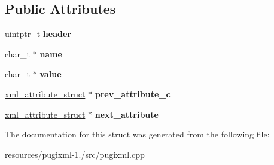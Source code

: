 \subsection*{Public Attributes}
\begin{DoxyCompactItemize}
\item 
\hypertarget{structpugi_1_1xml__attribute__struct_a0dca6ca6c129bbf87a7ebaf87f3e12de}{uintptr\+\_\+t {\bfseries header}}\label{structpugi_1_1xml__attribute__struct_a0dca6ca6c129bbf87a7ebaf87f3e12de}

\item 
\hypertarget{structpugi_1_1xml__attribute__struct_aa886c4aae23a132e1704717721ee2c19}{char\+\_\+t $\ast$ {\bfseries name}}\label{structpugi_1_1xml__attribute__struct_aa886c4aae23a132e1704717721ee2c19}

\item 
\hypertarget{structpugi_1_1xml__attribute__struct_ae652627d56cb9dcc0afdd1fbf6570364}{char\+\_\+t $\ast$ {\bfseries value}}\label{structpugi_1_1xml__attribute__struct_ae652627d56cb9dcc0afdd1fbf6570364}

\item 
\hypertarget{structpugi_1_1xml__attribute__struct_a0e3a022235b316e4cfc1034ceb7d7862}{\hyperlink{structpugi_1_1xml__attribute__struct}{xml\+\_\+attribute\+\_\+struct} $\ast$ {\bfseries prev\+\_\+attribute\+\_\+c}}\label{structpugi_1_1xml__attribute__struct_a0e3a022235b316e4cfc1034ceb7d7862}

\item 
\hypertarget{structpugi_1_1xml__attribute__struct_a9860c0eb7fa72dc9b69ee9b0575f9efc}{\hyperlink{structpugi_1_1xml__attribute__struct}{xml\+\_\+attribute\+\_\+struct} $\ast$ {\bfseries next\+\_\+attribute}}\label{structpugi_1_1xml__attribute__struct_a9860c0eb7fa72dc9b69ee9b0575f9efc}

\end{DoxyCompactItemize}


The documentation for this struct was generated from the following file\+:\begin{DoxyCompactItemize}
\item 
resources/pugixml-\/1./src/pugixml.\+cpp\end{DoxyCompactItemize}
